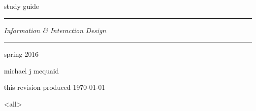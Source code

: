 \mode*

\begin{titlepage}

  \thispagestyle{empty}

\begin{center}

  \vspace{12pt}

  \hrulefill

  \vspace{64pt}

  \vspace{8pt}

  {\sc study guide}

  \vspace{6pt}

  \rule{196pt}{0.5pt}

  \vspace{12pt}

  {\large\it \textcolor[rgb]{0,0.2,0.35}{Information \& Interaction Design}}

  \vspace{6pt}

  \rule{196pt}{0.5pt}

  \vspace{6pt}

  {\sc spring 2016

  \vspace{8pt}

  \vspace{168pt}

  michael j m{\scriptsize c}quaid

  \vspace{24pt}

  {\large {}}

  \vfill

  this revision produced \MakeLowercase{\today}}

  \vspace{18pt}

  \hrulefill

\end{center}

\end{titlepage}

\mode<all>
